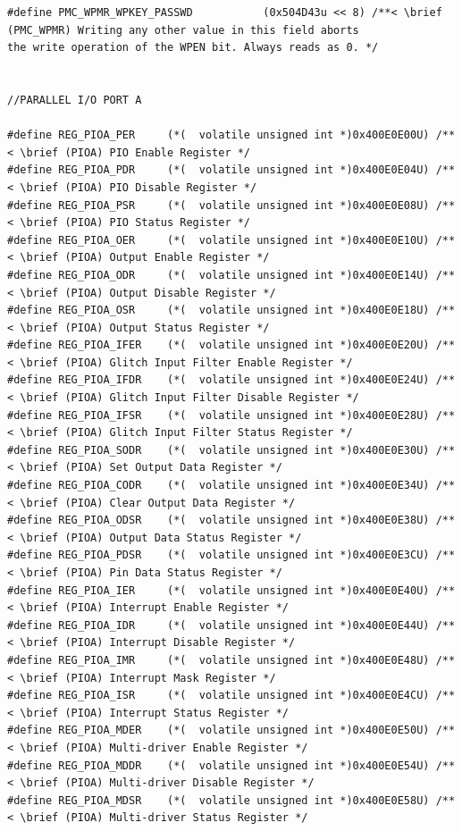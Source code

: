 \documentclass[12pt]{article}
\begin{document}
\begin{tiny}
\begin{verbatim}
#define PMC_WPMR_WPKEY_PASSWD           (0x504D43u << 8) /**< \brief (PMC_WPMR) Writing any other value in this field aborts 
the write operation of the WPEN bit. Always reads as 0. */


//PARALLEL I/O PORT A

#define REG_PIOA_PER     (*(  volatile unsigned int *)0x400E0E00U) /**< \brief (PIOA) PIO Enable Register */
#define REG_PIOA_PDR     (*(  volatile unsigned int *)0x400E0E04U) /**< \brief (PIOA) PIO Disable Register */
#define REG_PIOA_PSR     (*(  volatile unsigned int *)0x400E0E08U) /**< \brief (PIOA) PIO Status Register */
#define REG_PIOA_OER     (*(  volatile unsigned int *)0x400E0E10U) /**< \brief (PIOA) Output Enable Register */
#define REG_PIOA_ODR     (*(  volatile unsigned int *)0x400E0E14U) /**< \brief (PIOA) Output Disable Register */
#define REG_PIOA_OSR     (*(  volatile unsigned int *)0x400E0E18U) /**< \brief (PIOA) Output Status Register */
#define REG_PIOA_IFER    (*(  volatile unsigned int *)0x400E0E20U) /**< \brief (PIOA) Glitch Input Filter Enable Register */
#define REG_PIOA_IFDR    (*(  volatile unsigned int *)0x400E0E24U) /**< \brief (PIOA) Glitch Input Filter Disable Register */
#define REG_PIOA_IFSR    (*(  volatile unsigned int *)0x400E0E28U) /**< \brief (PIOA) Glitch Input Filter Status Register */
#define REG_PIOA_SODR    (*(  volatile unsigned int *)0x400E0E30U) /**< \brief (PIOA) Set Output Data Register */
#define REG_PIOA_CODR    (*(  volatile unsigned int *)0x400E0E34U) /**< \brief (PIOA) Clear Output Data Register */
#define REG_PIOA_ODSR    (*(  volatile unsigned int *)0x400E0E38U) /**< \brief (PIOA) Output Data Status Register */
#define REG_PIOA_PDSR    (*(  volatile unsigned int *)0x400E0E3CU) /**< \brief (PIOA) Pin Data Status Register */
#define REG_PIOA_IER     (*(  volatile unsigned int *)0x400E0E40U) /**< \brief (PIOA) Interrupt Enable Register */
#define REG_PIOA_IDR     (*(  volatile unsigned int *)0x400E0E44U) /**< \brief (PIOA) Interrupt Disable Register */
#define REG_PIOA_IMR     (*(  volatile unsigned int *)0x400E0E48U) /**< \brief (PIOA) Interrupt Mask Register */
#define REG_PIOA_ISR     (*(  volatile unsigned int *)0x400E0E4CU) /**< \brief (PIOA) Interrupt Status Register */
#define REG_PIOA_MDER    (*(  volatile unsigned int *)0x400E0E50U) /**< \brief (PIOA) Multi-driver Enable Register */
#define REG_PIOA_MDDR    (*(  volatile unsigned int *)0x400E0E54U) /**< \brief (PIOA) Multi-driver Disable Register */
#define REG_PIOA_MDSR    (*(  volatile unsigned int *)0x400E0E58U) /**< \brief (PIOA) Multi-driver Status Register */

\end{verbatim}
\end{tiny}
\end{document}
